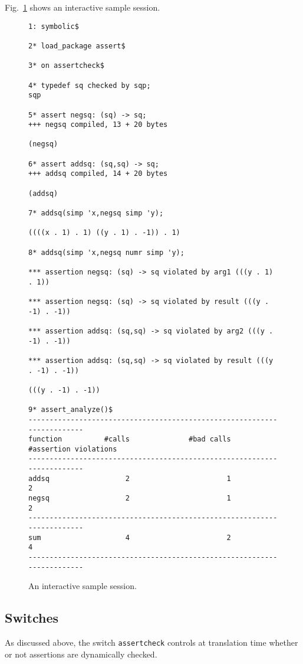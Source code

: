 Fig.~\ref{FIG:sample} shows an interactive sample session.
%
\begin{figure}
  \begin{small}
\begin{verbatim}
1: symbolic$

2* load_package assert$

3* on assertcheck$

4* typedef sq checked by sqp;
sqp

5* assert negsq: (sq) -> sq;
+++ negsq compiled, 13 + 20 bytes

(negsq)

6* assert addsq: (sq,sq) -> sq;
+++ addsq compiled, 14 + 20 bytes

(addsq)

7* addsq(simp 'x,negsq simp 'y);

((((x . 1) . 1) ((y . 1) . -1)) . 1)

8* addsq(simp 'x,negsq numr simp 'y);

*** assertion negsq: (sq) -> sq violated by arg1 (((y . 1) . 1))

*** assertion negsq: (sq) -> sq violated by result (((y . -1) . -1))

*** assertion addsq: (sq,sq) -> sq violated by arg2 (((y . -1) . -1))

*** assertion addsq: (sq,sq) -> sq violated by result (((y . -1) . -1))

(((y . -1) . -1))

9* assert_analyze()$
------------------------------------------------------------------------
function          #calls              #bad calls   #assertion violations
------------------------------------------------------------------------
addsq                  2                       1                       2
negsq                  2                       1                       2
------------------------------------------------------------------------
sum                    4                       2                       4
------------------------------------------------------------------------
\end{verbatim}
  \end{small}
  \caption{An interactive sample session.}\label{FIG:sample}
\end{figure}

\subsection{Switches}
As discussed above, the switch \texttt{assertcheck} controls at
translation time whether or not assertions are dynamically checked.


